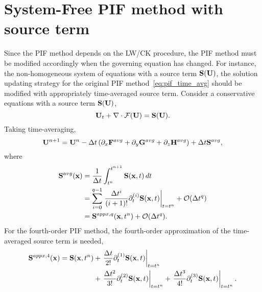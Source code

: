 \section{System-Free PIF method with source term}\label{sec:sfpif_source}

Since the PIF method depends on the LW/CK procedure,
the PIF method must be modified accordingly when the governing equation has changed.
For instance, the non-homogeneous system of equations with a source term \( \mathbf{S}(\mathbf{U}) \),
the solution updating strategy for the original PIF method~\cref{eq:pif_time_avg}
should be modified with appropriately time-averaged source term.
Consider a conservative equations with a source term \( \mathbf{S}(\mathbf{U}) \),
\begin{equation}\label{eq:sf_source_gov}
    \mathbf{U}_{t} + \nabla \cdot \mathcal{F}(\mathbf{U}) = \mathbf{S}(\mathbf{U}).
\end{equation}
Taking time-averaging,
\begin{equation}\label{eq:sf_source_time_average}
    \mathbf{U}^{n + 1} = \mathbf{U}^{n} - \Delta t \left( \partial_{x} \mathbf{F}^{avg} + \partial_{y} \mathbf{G}^{avg} + \partial_{z} \mathbf{H}^{avg} \right)
        + \Delta t \mathbf{S}^{avg},
\end{equation}
where
\begin{equation}\label{eq:sf_source_time_taylor}
    \begin{split}
        \mathbf{S}^{avg} (\mathbf{x})
        &= \frac{1}{\Delta t} \int^{t^{n + 1}}_{t^n} \mathbf{S}(\mathbf{x}, t) \mathop{dt}\\
        &= \sum\limits_{i=0}^{q-1}
            \left.\frac{\Delta t^{i}}{(i+1)!} \partial_{t}^{(i)} \mathbf{S} (\mathbf{x}, t) \right|_{t = t^{n}} + \mathcal{O}(\Delta t^{q}) \\
        &= \mathbf{S}^{appx,q} (\mathbf{x}, t^{n}) + \mathcal{O}(\Delta t^{q}).
    \end{split}
\end{equation}
For the fourth-order PIF method, the fourth-order approximation of the time-averaged source term is needed,
\begin{equation}\label{eq:sf_source_4order}
    \begin{split}
        \mathbf{S}^{appx, 4} (\mathbf{x}) = \mathbf{S} (\mathbf{x}, t^{n})
            &+ \left. \frac{\Delta t}{2!} \partial_{t}^{(1)} \mathbf{S} (\mathbf{x}, t) \right|_{t = t^{n}}\\
            &+ \left. \frac{\Delta t^{2}}{3!} \partial_{t}^{(2)} \mathbf{S} (\mathbf{x}, t) \right|_{t = t^{n}}
            + \left. \frac{\Delta t^{3}}{4!} \partial_{t}^{(3)} \mathbf{S} (\mathbf{x}, t) \right|_{t = t^{n}}.
    \end{split}
\end{equation}

